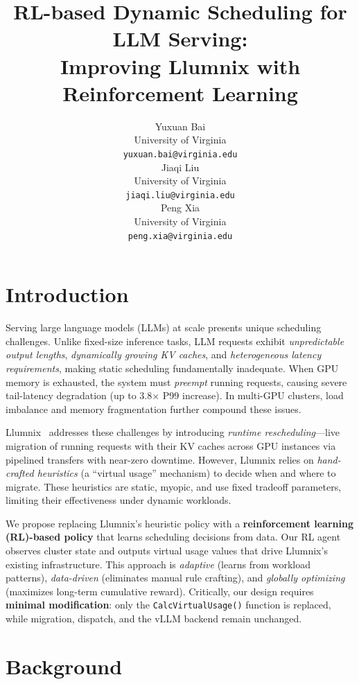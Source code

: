 \documentclass{article}
\title{RL-based Dynamic Scheduling for LLM Serving:\\Improving Llumnix with Reinforcement Learning}
\author{
  Yuxuan Bai \\
  University of Virginia \\
  \texttt{yuxuan.bai@virginia.edu} \\
  \And
  Jiaqi Liu \\
  University of Virginia \\
  \texttt{jiaqi.liu@virginia.edu} \\
  \And
  Peng Xia \\
  University of Virginia \\
  \texttt{peng.xia@virginia.edu} \\
}
\begin{document}
\maketitle

\vspace{-1em}
\section{Introduction}
\vspace{-0.3em}

Serving large language models (LLMs) at scale presents unique scheduling challenges.
Unlike fixed-size inference tasks, LLM requests exhibit \emph{unpredictable output lengths}, \emph{dynamically growing KV caches}, and \emph{heterogeneous latency requirements}, making static scheduling fundamentally inadequate.
When GPU memory is exhausted, the system must \emph{preempt} running requests, causing severe tail-latency degradation (up to 3.8$\times$ P99 increase). In multi-GPU clusters, load imbalance and memory fragmentation further compound these issues.

Llumnix~\cite{sun2024llumnix} addresses these challenges by introducing \emph{runtime rescheduling}---live migration of running requests with their KV caches across GPU instances via pipelined transfers with near-zero downtime.
However, Llumnix relies on \emph{hand-crafted heuristics} (a ``virtual usage'' mechanism) to decide when and where to migrate. These heuristics are static, myopic, and use fixed tradeoff parameters, limiting their effectiveness under dynamic workloads.

We propose replacing Llumnix's heuristic policy with a \textbf{reinforcement learning (RL)-based policy} that learns scheduling decisions from data. Our RL agent observes cluster state and outputs virtual usage values that drive Llumnix's existing infrastructure. This approach is \emph{adaptive} (learns from workload patterns), \emph{data-driven} (eliminates manual rule crafting), and \emph{globally optimizing} (maximizes long-term cumulative reward). Critically, our design requires \textbf{minimal modification}: only the \texttt{CalcVirtualUsage()} function is replaced, while migration, dispatch, and the vLLM backend remain unchanged.

\vspace{-0.5em}
\section{Background}
\vspace{-0.3em}
\end{document}
